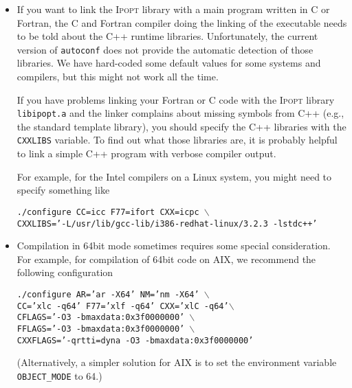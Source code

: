 \documentclass[10pt]{article}
\newcommand{\Ipopt}{\textsc{Ipopt}\xspace}
\begin{document}
\begin{itemize}
\item If you want to link the \Ipopt library with a main program
  written in C or Fortran, the C and Fortran compiler doing the
  linking of the executable needs to be told about the C++ runtime
  libraries.  Unfortunately, the current version of {\tt autoconf}
  does not provide the automatic detection of those libraries.  We
  have hard-coded some default values for some systems and compilers,
  but this might not work all the time.

  If you have problems linking your Fortran or C code with the \Ipopt
  library {\tt libipopt.a} and the linker complains about missing
  symbols from C++ (e.g., the standard template library), you should
  specify the C++ libraries with the {\tt CXXLIBS} variable.  To find out
  what those libraries are, it is probably helpful to link a  simple C++
  program with verbose compiler output.

  For example, for the Intel compilers on a Linux system, you
  might need to specify something like

  {\tt ./configure CC=icc F77=ifort CXX=icpc $\backslash$\\ \hspace*{14ex} CXXLIBS='-L/usr/lib/gcc-lib/i386-redhat-linux/3.2.3 -lstdc++'}

\item Compilation in 64bit mode sometimes requires some special
  consideration.  For example, for compilation of 64bit code on AIX,
  we recommend the following configuration

  {\tt ./configure AR='ar -X64' NM='nm -X64' $\backslash$\\
    \hspace*{14ex} CC='xlc -q64' F77='xlf -q64' CXX='xlC
    -q64'$\backslash$\\ \hspace*{14ex} CFLAGS='-O3
    -bmaxdata:0x3f0000000'
    $\backslash$\\ \hspace*{14ex} FFLAGS='-O3 -bmaxdata:0x3f0000000' $\backslash$\\
    \hspace*{14ex} CXXFLAGS='-qrtti=dyna -O3 -bmaxdata:0x3f0000000'}

  (Alternatively, a simpler solution for AIX is to set the environment variable {\tt OBJECT\_MODE} to 64.)



\end{itemize}
\end{document}
